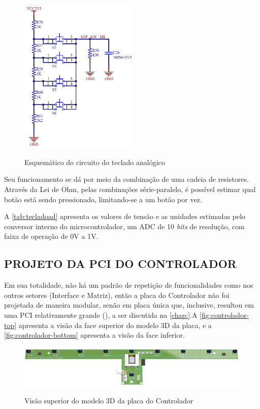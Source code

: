 \begin{figure}[H]
    \centering
    \caption{Esquemático do circuito do teclado analógico}
    \includegraphics[width=0.5\textwidth]{./dados/figuras/tecladoad}
    \label{fig:tecladoad}
\end{figure}

Seu funcionamento se dá por meio da combinação de uma cadeia de resistores. Através da Lei de Ohm, pelas combinações série-paralelo, é possível estimar qual botão está sendo pressionado, limitando-se a um botão por vez.

A \autoref{tab:tecladoad} apresenta os valores de tensão e as unidades estimadas pelo conversor interno do microcontrolador, um ADC de 10 \emph{bits} de resolução, com faixa de operação de 0V a 1V.



\subsection{PROJETO DA PCI DO CONTROLADOR}
\label{subsec:pcicontrol}

Em sua totalidade, não há um padrão de repetição de funcionalidades como nos outros setores (Interface e Matriz), então a placa do Controlador não foi projetada de maneira modular, senão em placa única que, inclusive, resultou em uma PCI relativamente grande (), a ser discutida na \autoref{chap:}.A \autoref{fig:controlador-top} apresenta a visão da face superior do modelo 3D da placa, e a \autoref{fig:controlador-bottom} apresenta a visão da face inferior.

\begin{figure}[H]
    \centering
    \caption{Visão superior do modelo 3D da placa do Controlador}
    \includegraphics[width=1.0\textwidth]{./dados/figuras/controlador-top}
    \label{fig:controlador-top}
\end{figure}

